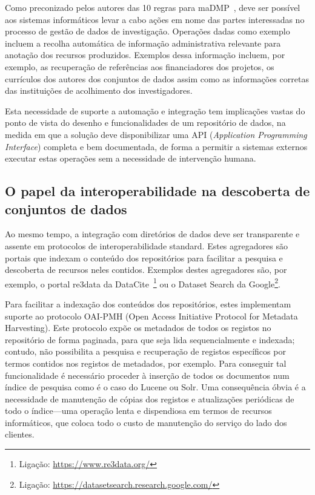 \documentclass[sigconf,nonacm]{acmart}
\begin{document}
Como preconizado pelos autores das 10 regras para maDMP~\cite{miksa_tomasz_2018_1172673}, deve ser possível aos sistemas informáticos levar a cabo ações em nome das partes interessadas no processo de gestão de dados de investigação. Operações dadas como exemplo incluem a recolha automática de informação administrativa relevante para anotação dos recursos produzidos. Exemplos dessa informação incluem, por exemplo, as recuperação de referências aos financiadores dos projetos, os currículos dos autores dos conjuntos de dados assim como as informações corretas das instituições de acolhimento dos investigadores. 

Esta necessidade de suporte a automação e integração tem implicações vastas do ponto de vista do desenho e funcionalidades de um repositório de dados, na medida em que a solução deve disponibilizar uma API (\textit{Application Programming Interface}) completa e bem documentada, de forma a permitir a sistemas externos executar estas operações sem a necessidade de intervenção humana.

\subsection{O papel da interoperabilidade na descoberta de conjuntos de dados}

Ao mesmo tempo, a integração com diretórios de dados deve ser transparente e assente em protocolos de interoperabilidade standard. Estes agregadores são portais que indexam o conteúdo dos repositórios para facilitar a pesquisa e descoberta de recursos neles contidos. Exemplos destes agregadores são, por exemplo, o portal re3data da DataCite~\footnote{Ligação: \url{https://www.re3data.org/}} ou o Dataset Search da Google\footnote{Ligação: \url{https://datasetsearch.research.google.com/}}.

Para facilitar a indexação dos conteúdos dos repositórios, estes implementam suporte ao protocolo OAI-PMH (Open Access Initiative Protocol for Metadata Harvesting). Este protocolo expõe os metadados de todos os registos no repositório de forma paginada, para que seja lida sequencialmente e indexada; contudo, não possibilita a pesquisa e recuperação de registos específicos por termos contidos nos registos de metadados, por exemplo. Para conseguir tal funcionalidade é necessário proceder à inserção de todos os documentos num índice de pesquisa como é o caso do Lucene ou Solr. Uma consequência óbvia é a necessidade de manutenção de cópias dos registos e atualizações periódicas de todo o índice---uma operação lenta e dispendiosa em termos de recursos informáticos, que coloca todo o custo de manutenção do serviço do lado dos clientes.
\end{document}
